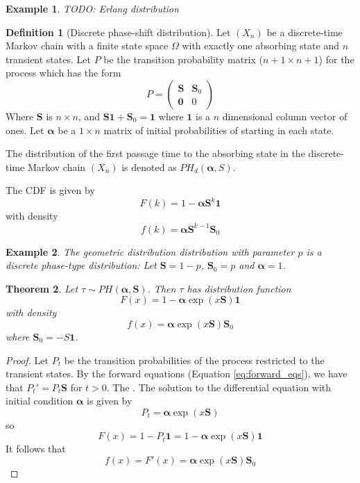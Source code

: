 \documentclass{article}
\theoremstyle{plain}
\newtheorem{theorem}{Theorem}[section]
\newtheorem{example}{Example}[theorem]
\theoremstyle{definition}
\newtheorem{defn}[theorem]{Definition}
\theoremstyle{remark}
\numberwithin{equation}{section}
\begin{document}
\begin{example}
TODO: Erlang distribution
\end{example}

\begin{defn}[Discrete phase-shift distribution]
\cite{neuts1981}
Let $(X_n)$ be a discrete-time Markov chain with a finite state space $\Omega$ with exactly one absorbing state and $n$ transient states.
Let $P$ be the transition probability matrix ($n + 1 \times n + 1$) for the process which has the form
$$
P = \begin{pmatrix}
\mathbf{S} & \mathbf{S}_0\\
\mathbf{0} & 0
\end{pmatrix}
$$
Where $\mathbf{S}$ is $n \times n$, and $\mathbf{S} \mathbf{1}  + \mathbf{S}_0 = \mathbf{1}$ where $\mathbf{1}$ is a $n$ dimensional column vector of ones.
Let $\boldsymbol{\alpha}$ be a $1 \times n$ matrix of initial probabilities of starting in each state.

The distribution of the first passage time to the absorbing state in the discrete-time Markov chain $(X_n)$ is denoted as $PH_d(\boldsymbol{\alpha}, S)$.

The CDF is given by
$$
F(k) = 1 - \boldsymbol{\alpha} \mathbf{S}^k \mathbf{1}
$$
with density
$$
f(k) = \boldsymbol{\alpha} \mathbf{S}^{k - 1} \mathbf{S}_0
$$
\end{defn}

\begin{example}
The geometric distribution distribution with parameter $p$ is a discrete phase-type distribution:
Let $\mathbf S = 1 - p$, $\mathbf{S}_0 = p$ and $\boldsymbol{\alpha} = 1$.
\end{example}

\begin{theorem}
Let $\tau \sim PH(\boldsymbol{\alpha}, \mathbf{S})$.
Then $\tau$ has distribution function
$$
F(x) = 1 - \boldsymbol{\alpha} \exp(x \mathbf{S}) \mathbf{1}
$$
with density
$$
f(x) = \boldsymbol{\alpha} \exp(x \mathbf{S}) \mathbf{S}_0
$$
where
$\mathbf{S}_0 = - S \mathbf{1}$.
\end{theorem}

\begin{proof}
Let $P_t$ be the transition probabilities of the process restricted to the transient states.
By the forward equations (Equation \eqref{eq:forward_eqs}), we have that $P_t' = P_t \mathbf{S}$ for $t > 0$.
The .
The solution to the differential equation with initial condition $\boldsymbol{\alpha}$ is given by 
$$
P_t = \boldsymbol{\alpha} \exp(x \mathbf{S})
$$
so
$$
F(x) = 1 - P_t \mathbf{1} = 1 - \boldsymbol{\alpha} \exp(x \mathbf{S}) \mathbf{1}
$$
It follows that
$$
f(x) = F'(x) = \boldsymbol{\alpha} \exp(x \mathbf{S}) \mathbf{S}_0
$$
\end{proof}
\end{document}
